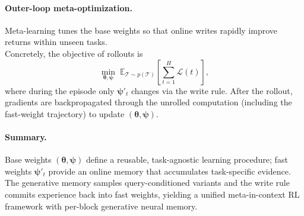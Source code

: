 \vspace{0.75ex}
\paragraph{Outer-loop meta-optimization.}
Meta-learning tunes the base weights so that online writes rapidly improve returns within unseen tasks.
\\
Concretely, the objective of rollouts is
\begin{equation}
\min_{\boldsymbol{\theta},\boldsymbol{\psi}}
\;
\mathbb{E}_{\mathcal{T}\sim p(\mathcal{T})}
\left[
\sum_{t=1}^{H} \mathcal{L}(t)
\right],
\end{equation}
where during the episode only \( \boldsymbol{\psi}'_t \) changes via the write rule.
After the rollout, gradients are backpropagated through the unrolled computation (including the fast-weight trajectory) to update \( (\boldsymbol{\theta},\boldsymbol{\psi}) \).

\vspace{0.75ex}
\paragraph{Summary.}
Base weights \( (\boldsymbol{\theta},\boldsymbol{\psi}) \) define a reusable, task-agnostic learning procedure; fast weights \( \boldsymbol{\psi}'_t \) provide an online memory that accumulates task-specific evidence.
The generative memory samples query-conditioned variants and the write rule commits experience back into fast weights, yielding a unified meta-in-context RL framework with per-block generative neural memory.